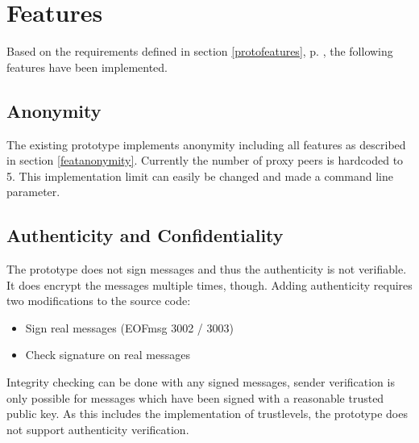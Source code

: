 \section{Features}
Based on the requirements defined in section \ref{protofeatures}, 
p. \pageref{protofeatures}, the following features have been implemented. 
\subsection{Anonymity}
The existing prototype implements anonymity including
all features as described in section \ref{featanonymity}.
Currently the number of proxy peers is hardcoded to 5. This implementation
limit can easily be changed and made a command line parameter.
\subsection{Authenticity and Confidentiality}
The prototype does not sign messages and thus the authenticity is not
verifiable. It does encrypt the messages multiple times, though.
Adding authenticity requires two modifications to the source code:
\begin{itemize}
\item Sign real messages (EOFmsg 3002 / 3003)
\item Check signature on real messages
\end{itemize}
Integrity checking can be done with any signed messages, sender verification
is only possible for messages which have been signed with a reasonable
trusted public key. As this includes the implementation of trustlevels, the
prototype does not support authenticity verification.
